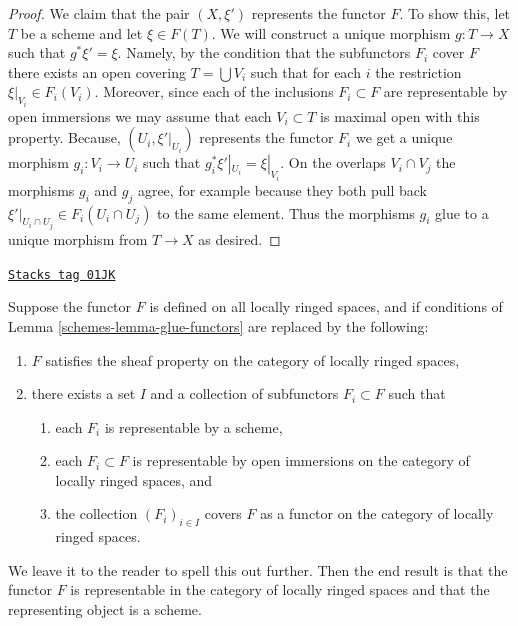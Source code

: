 \begin{proof}
\medskip\noindent
We claim that the pair $(X, \xi')$ represents the functor $F$.
To show this, let $T$ be a scheme and let $\xi \in F(T)$.
We will construct a unique morphism $g : T \to X$ such that
$g^*\xi' = \xi$. Namely, by the condition that the subfunctors
$F_i$ cover $F$ there exists an open covering $T = \bigcup V_i$
such that for each $i$ the restriction $\xi|_{V_i} \in F_i(V_i)$.
Moreover, since each of the inclusions $F_i \subset F$ are representable
by open immersions we may assume that each $V_i \subset T$ is maximal
open with this property.
Because, $(U_i, \xi'|_{U_i})$ represents the functor $F_i$ we
get a unique morphism $g_i : V_i \to U_i$ such that
$g_i^*\xi'|_{U_i} = \xi|_{V_i}$. On the overlaps $V_i \cap V_j$
the morphisms $g_i$ and $g_j$ agree, for example because they both
pull back $\xi'|_{U_i \cap U_j} \in F_i(U_i \cap U_j)$
to the same element. Thus the morphisms $g_i$ glue to a unique morphism
from $T \to X$ as desired.
\end{proof}

\begin{remark}
\label{schemes-remark-representable-locally-ringed}
\href{https://stacks.math.columbia.edu/tag/01JK}{\texttt{Stacks tag 01JK}}

Suppose the functor $F$ is defined on all locally ringed spaces,
and if conditions of Lemma \ref{schemes-lemma-glue-functors} are replaced by
the following:
\begin{enumerate}
\item $F$ satisfies the sheaf property on the category of locally ringed
spaces,
\item there exists a set $I$ and a collection of subfunctors
$F_i \subset F$ such that
\begin{enumerate}
\item each $F_i$ is representable by a scheme,
\item each $F_i \subset F$ is representable by open immersions
on the category of locally ringed spaces, and
\item the collection $(F_i)_{i \in I}$ covers $F$
as a functor on the category of locally ringed spaces.
\end{enumerate}
\end{enumerate}
We leave it to the reader to spell this out further.
Then the end result is that the functor $F$ is
representable in the category of locally ringed spaces
and that the representing object is a scheme.
\end{remark}

